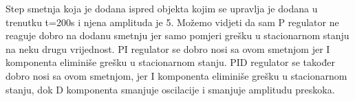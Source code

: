Step smetnja koja je dodana ispred objekta kojim se upravlja je dodana u trenutku t=200s i njena amplituda je 5. Možemo vidjeti da sam P regulator ne reaguje dobro na dodanu smetnju jer samo pomjeri grešku u stacionarnom stanju na neku drugu vrijednost. PI regulator se dobro nosi sa ovom smetnjom jer I komponenta eliminiše grešku u stacionarnom stanju. PID regulator se također dobro nosi sa ovom smetnjom, jer I komponenta eliminiše grešku u stacionarnom stanju, dok D komponenta smanjuje oscilacije i smanjuje amplitudu preskoka.
















